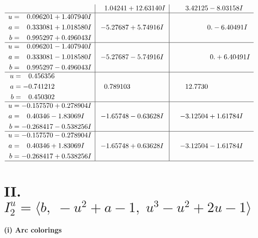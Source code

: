 \documentclass[1p]{elsarticle_modified}
\theoremstyle{definition}
\begin{document}
$$\begin{array}{c|c|c}
 & \phantom{-}1.04241 + 12.63140 I & \phantom{-}3.42125 - 8.03158 I \\ \hline\begin{aligned}
u &= \phantom{-}0.096201 + 1.407940 I \\
a &= \phantom{-}0.333081 + 1.018580 I \\
b &= \phantom{-}0.995297 + 0.496043 I\end{aligned}
 & -5.27687 + 5.74916 I & \phantom{-0.000000 } 0. - 6.40491 I \\ \hline\begin{aligned}
u &= \phantom{-}0.096201 - 1.407940 I \\
a &= \phantom{-}0.333081 - 1.018580 I \\
b &= \phantom{-}0.995297 - 0.496043 I\end{aligned}
 & -5.27687 - 5.74916 I & \phantom{-0.000000 -}0. + 6.40491 I \\ \hline\begin{aligned}
u &= \phantom{-}0.456356\phantom{ +0.000000I} \\
a &= -0.741212\phantom{ +0.000000I} \\
b &= \phantom{-}0.450302\phantom{ +0.000000I}\end{aligned}
 & \phantom{-}0.789103\phantom{ +0.000000I} & \phantom{-}12.7730\phantom{ +0.000000I} \\ \hline\begin{aligned}
u &= -0.157570 + 0.278904 I \\
a &= \phantom{-}0.40346 - 1.83069 I \\
b &= -0.268417 - 0.538256 I\end{aligned}
 & -1.65748 - 0.63628 I & -3.12504 + 1.61784 I \\ \hline\begin{aligned}
u &= -0.157570 - 0.278904 I \\
a &= \phantom{-}0.40346 + 1.83069 I \\
b &= -0.268417 + 0.538256 I\end{aligned}
 & -1.65748 + 0.63628 I & -3.12504 - 1.61784 I\\
 \hline 
 \end{array}$$\newpage\newpage\renewcommand{\arraystretch}{1}
\centering \section*{II. $I^u_{2}= \langle b,\;- u^2+a-1,\;u^3- u^2+2 u-1 \rangle$}
\flushleft \textbf{(i) Arc colorings}\\
\end{document}
